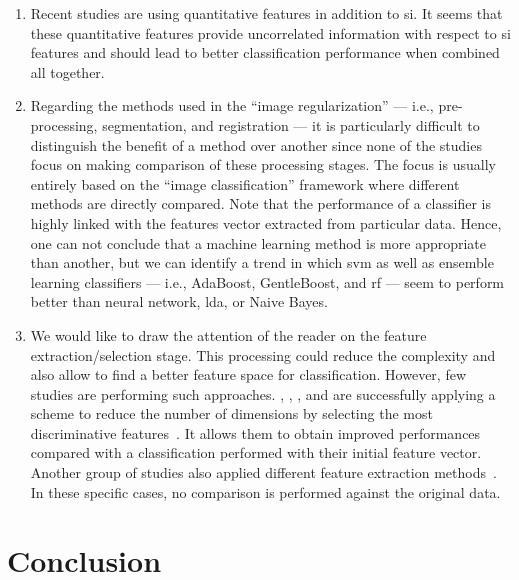 \begin{enumerate}
\item Recent studies are using quantitative features in addition to \ac{si}.
It seems that these quantitative features provide uncorrelated information with respect to \ac{si} features and should lead to better classification performance when combined all together. 

\item Regarding the methods used in the ``image regularization'' --- i.e., pre-processing, segmentation, and registration --- it is particularly difficult to distinguish the benefit of a method over another since none of the studies focus on making comparison of these processing stages.
The focus is usually entirely based on the ``image classification'' framework where different methods are directly compared.
Note that the performance of a classifier is highly linked with the features vector extracted from particular data.
Hence, one can not conclude that a machine learning method is more appropriate than another, but we can identify a trend in which \ac{svm} as well as ensemble learning classifiers --- i.e., AdaBoost, GentleBoost, and \ac{rf} --- seem to perform better than neural network, \ac{lda}, or Naive Bayes.

\item We would like to draw the attention of the reader on the feature extraction/selection stage.
This processing could reduce the complexity and also allow to find a better feature space for classification.
However, few studies are performing such approaches.
\citeauthor{Niaf2012}, \citeauthor{khalvati2015automated}, \citeauthor{chung2015prostate}, and \citeauthor{rampun2016computer} are successfully applying a scheme to reduce the number of dimensions by selecting the most discriminative features~\cite{Niaf2011,Niaf2012,khalvati2015automated,chung2015prostate,rampun2016computer,rampun2015computer}.
It allows them to obtain improved performances compared with a classification performed with their initial feature vector.
Another group of studies also applied different feature extraction methods~\cite{Viswanath2008a,Viswanath2008,Viswanath2012,Tiwari2007,Tiwari2008,Tiwari2009,Tiwari2010,Tiwari2012,Tiwari2013,lehaire2014computer,rampun2016computerb,rampun2015classifying}.
In these specific cases, no comparison is performed against the original data.
\end{enumerate}

\section{Conclusion}\label{subsec:chp3:dis:gen-dis}

